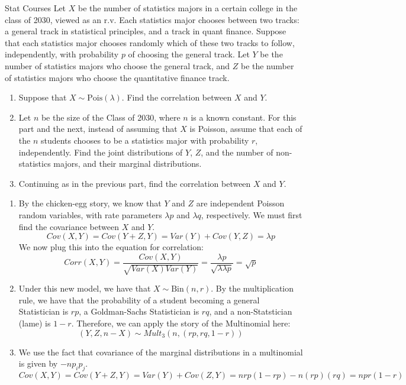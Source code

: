 \documentclass[11.5pt]{article}
\begin{document}
\begin{exercise}{Stat Courses}
Let $X$ be the number of statistics majors in a certain college in the class of 2030, viewed as an r.v. Each statistics major chooses between two tracks: a general track in statistical principles, and a track in quant finance. Suppose that each statistics major chooses randomly which of these two tracks to follow, independently, with probability $p$ of choosing the general track. Let $Y$ be the number of statistics majors who choose the general track, and $Z$ be the number of statistics majors who choose the quantitative finance track. 

\begin{enumerate}
    \item Suppose that $X \sim \text{Pois}(\lambda)$. Find the correlation between
    $X$ and $Y$.
    \item Let $n$ be the size of the Class of 2030, where $n$ is a known constant. For 
    this part and the next, instead of assuming that $X$ is Poisson, assume that each 
    of the $n$ students chooses to be a statistics major with probability $r$, 
    independently. Find the joint distributions of $Y$, $Z$, and the number of 
    non-statistics majors, and their marginal distributions. 
    \item Continuing as in the previous part, find the correlation between
     $X$ and $Y$. 
\end{enumerate}
\end{exercise}

\begin{solution}{4}

\begin{enumerate}
    \item By the chicken-egg story, we know that $Y$ and $Z$ are independent Poisson
    random variables, with rate parameters $\lambda p $ and $\lambda q$, respectively. 
    We must first find the covariance between $X$ and $Y$.
        $$Cov(X,Y) = Cov(Y+Z, Y) = Var(Y) + Cov(Y,Z) = \lambda p$$
    We now plug this into the equation for correlation:
        $$Corr(X,Y)  =\frac{Cov(X,Y)}{\sqrt{Var(X)Var(Y)}} = \frac{\lambda p}{
        \sqrt{\lambda \lambda p}} = \sqrt{p} $$
    \item Under this new model, we have that $X\sim \text{Bin}(n,r)$. By the 
    multiplication rule, we have that the probability of a student becoming
    a general Statistician is $rp$, a Goldman-Sachs Statistician is $rq$, and a 
    non-Statstician (lame) is $1-r$. Therefore, we can apply the story of the
    Multinomial here:
        $$(Y, Z, n-X) \sim Mult_3(n, (rp, rq, 1-r)) $$
    \item We use the fact that covariance of the marginal distributions in a 
    multinomial is given by $-np_i p_j$.
        $$Cov(X,Y) = Cov(Y+Z, Y) = Var(Y) + Cov(Z,Y) = nrp(1-rp) - n(rp)(rq) 
        =npr(1-r)$$
\end{enumerate}
\end{solution}

\end{document}
